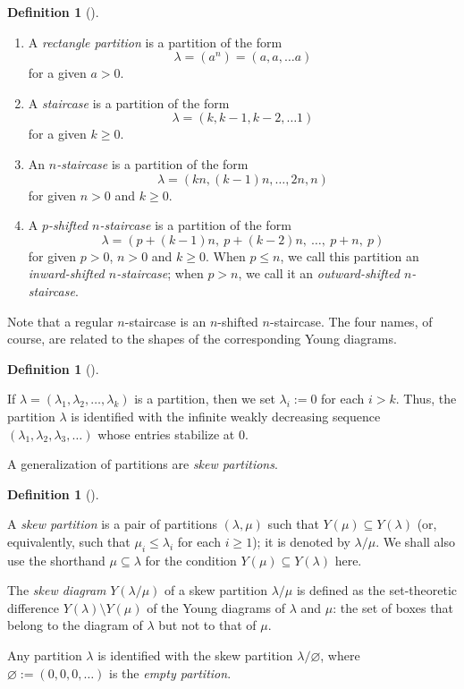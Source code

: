 \documentclass[numbers=enddot,12pt,final,onecolumn,notitlepage]{scrartcl}%
\theoremstyle{definition}
\newtheorem{defi}[theo]{Definition}
\newenvironment{definition}[1][]
{\begin{defi}[#1]\begin{leftbar}}
{\end{leftbar}\end{defi}}
\newcommand{\tup}[1]{\left( #1 \right)}
\renewcommand{\leq}{\leqslant}
\renewcommand{\geq}{\geqslant}
\theoremstyle{plainsl}
\begin{document}
\begin{definition}
\begin{enumerate}
    \item A \emph{rectangle partition} is a partition of the form 
\[\lambda = (a^n) = (a,a, \ldots a)\]
for a given $a > 0$.
    \item A \emph{staircase} is a partition of the form 
\[\lambda = (k, k-1, k-2, \ldots 1)\]
for a given $k \geq 0$.
    \item An \emph{$n$-staircase} is a partition of the form 
\[\lambda = (kn, (k-1)n, \ldots, 2n,  n)\]
for given $n > 0$ and $k \geq 0$.
    \item A \emph{$p$-shifted $n$-staircase} is a partition of the form
\[\lambda = (p+(k-1)n, \ p+(k-2)n, \ \ldots, \ p+n, \  p) \]
for given $p > 0$, $n > 0$ and $k \geq 0$.
When $p \leq n$, we call this partition an \emph{inward-shifted $n$-staircase};
when $p > n$, we call it an \emph{outward-shifted $n$-staircase}.
\end{enumerate}

\end{definition}

Note that a regular $n$-staircase is an $n$-shifted $n$-staircase.
The four names, of course, are related to the shapes of the corresponding Young diagrams.

\begin{definition}
If $\lambda = \tup{\lambda_1, \lambda_2, \ldots, \lambda_k}$ is
a partition, then we set $\lambda_i := 0$ for each $i > k$.
Thus, the partition $\lambda$ is identified with the infinite
weakly decreasing
sequence $\tup{\lambda_1, \lambda_2, \lambda_3, \ldots}$
whose entries stabilize at $0$.
\end{definition}

A generalization of partitions are \emph{skew partitions}.

\begin{definition}
A \emph{skew partition} is a pair of partitions $(\lambda, \mu)$ such that $Y\tup{\mu} \subseteq Y\tup{\lambda}$ (or, equivalently, such that $\mu_i \leq \lambda_i$ for each $i \geq 1$); it is denoted by $\lambda / \mu$.
We shall also use the shorthand $\mu \subseteq \lambda$ for the condition $Y\tup{\mu} \subseteq Y\tup{\lambda}$ here.

The \emph{skew diagram} $Y\tup{\lambda / \mu}$ of a skew partition $\lambda / \mu$ is defined as the set-theoretic difference $Y\tup{\lambda} \setminus Y\tup{\mu}$ of the Young diagrams of $\lambda$ and $\mu$: the set of boxes that belong to the diagram of $\lambda$ but not to that of $\mu$.

Any partition $\lambda$ is identified with the skew partition $\lambda / \varnothing$, where $\varnothing := \tup{0,0,0,\ldots}$ is the \emph{empty partition}.
\end{definition}
\end{document}
